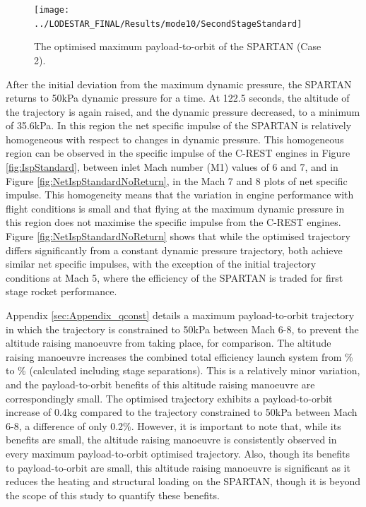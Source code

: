\begin{figure}[ht!]
\centering
\texttt{[image: ../LODESTAR\_FINAL/Results/mode10/SecondStageStandard]}
\caption{The optimised maximum payload-to-orbit of the SPARTAN (Case 2).}
\label{fig:SecondStageStandardNoReturn}
\end{figure}



After the initial deviation from the maximum dynamic pressure, the SPARTAN returns to 50kPa dynamic pressure for a time. 
At 122.5 seconds, the altitude of the trajectory is again raised, and the dynamic pressure decreased, to a minimum of 35.6kPa. In this region the net specific impulse of the SPARTAN is relatively homogeneous with respect to changes in dynamic pressure. This homogeneous region can be observed in the specific impulse of the C-REST engines in Figure \ref{fig:IspStandard}, between inlet Mach number (M1) values of 6 and 7, and in Figure \ref{fig:NetIspStandardNoReturn}, in the Mach 7 and 8 plots of net specific impulse. This homogeneity means that the variation in engine performance with flight conditions is small and that flying at the maximum dynamic pressure in this region does not maximise the specific impulse from the C-REST engines. Figure \ref{fig:NetIspStandardNoReturn} shows that while the optimised trajectory differs significantly from a constant dynamic pressure trajectory, both achieve similar net specific impulses, with the exception of the initial trajectory conditions at Mach 5, where the efficiency of the SPARTAN is traded for first stage rocket performance. 


Appendix \ref{sec:Appendix_qconst} details a maximum payload-to-orbit trajectory in which the trajectory is constrained to 50kPa between Mach 6-8, to prevent the altitude raising manoeuvre from taking place, for comparison. 
The altitude raising manoeuvre
increases the combined total efficiency launch system from \totalExergyEffqconstrained \% to \totalExergyEffStandardNoReturn \% (calculated including stage separations). This is a relatively minor variation, and the payload-to-orbit benefits of this altitude raising manoeuvre are correspondingly small. 
The optimised trajectory exhibits a payload-to-orbit increase of 0.4kg compared to the trajectory constrained to 50kPa between Mach 6-8, a difference of only 0.2\%.
However, it is important to note that, while its benefits are small, the altitude raising manoeuvre is consistently observed in every maximum payload-to-orbit optimised trajectory. 
Also, though its benefits to payload-to-orbit are small, this altitude raising manoeuvre is significant as it reduces the heating and structural loading on the SPARTAN, though it is beyond the scope of this study to quantify these benefits. 




